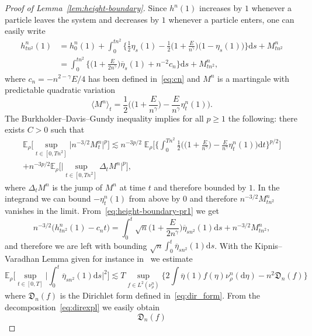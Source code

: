 \documentclass[10pt]{amsart}
\theoremstyle{definition}\newtheorem{defi}[theo]{Definition}\newtheorem{rema}[theo]{Remark}\newtheorem{exam}[theo]{Example}\newtheorem{exem}[theo]{Example}\newtheorem{nota}[theo]{Notation}
\renewcommand{\bar}{\overline}
\renewcommand{\ge}{\geqslant}
\newcommand*{\dd}{\mathrm{d}}
\newcommand*{\ds}{\dd s}
\newcommand*{\dt}{\dd t}
\begin{document}
\begin{proof}[Proof of Lemma~\ref{lem:height-boundary}]
Since $h^n(1)$ increases by $1$ whenever a particle leaves the system and decreases by $1$ whenever a particle enters, one can easily write
\begin{align}\label{eq:height-boundary-pr1}
\nonumber
h^n_{{tn^2}} (1) & = h_0^n(1) + \int_0^{{tn^2}} \bigg\{ \frac12 \eta_{{s}} (1) - \frac12 \Big(1 +
\frac{E}{n^{\gamma}} \Big) \big(1-\eta_{{s}}(1)\big) \bigg\} \ds + M^n_{{tn^2}}\\
& = \int_0^{{tn^2}} \bigg\{ \Big(1 +
\frac{E}{2n^{\gamma}} \Big) \bar\eta_{{s}} (1) + {n^{-2}} c_n \bigg\} \ds + M^n_{{tn^2}},
\end{align}
where $c_n=-n^{2-\gamma}E/4$ has been defined in~\eqref{eq:cn} and $M^n$ is a martingale with predictable quadratic variation
\[
\langle M^n \rangle_t = \frac{{1}}{2} \bigg(\Big(1 +
\frac{E}{n^{\gamma}} \Big) - \frac{E}{n^{\gamma}} \eta^n_{{t}} (1) \bigg).
\]
The Burkholder--Davis--Gundy inequality implies for all $p \ge 1$ the following: there exists $C>0$ such that
\begin{multline*}
\mathbb{E}_\rho \Big[\sup_{t \in [0,{{Tn^2}}]} \big| n^{- 3 / 2} M^n_t \big|^p\Big] \lesssim n^{- 3 p / 2} \; \mathbb{E}_\rho \bigg[\bigg\{ \int_0^{{Tn^2}} \frac{{1}}{2} \bigg(\Big(1 +
\frac{E}{n^{\gamma}} \Big) - \frac{E}{n^{\gamma}} \eta^n_{{t}} (1) \bigg) \dt \bigg\}^{p / 2} \bigg]\\
+ n^{- 3 p / 2} \mathbb{E}_\rho \Big[\Big| \sup_{t \in [0,{{Tn^2}}]} \Delta_t M^n \Big|^p\Big],
\end{multline*}
where $\Delta_t M^n$ is the jump of $M^n$ at time $t$ and therefore bounded by $1$. In the integrand we can bound $-\eta^n_{{t}} (1)$ from above by $0$ and therefore $n^{-3/2}M_{{tn^2}}^n$ vanishes in the limit. From~\eqref{eq:height-boundary-pr1} we get
\[
n^{-3/2}\big(h_{{tn^2}}^n(1)-c_nt\big) = \int_0^t \sqrt n \Big(1 +
\frac{E}{2n^{\gamma}} \Big) \bar\eta_{sn^2} (1) \ds + n^{-3/2} M_{{tn^2}}^n,
\]
and therefore we are left with bounding $\sqrt n \int_0^t \bar\eta_{sn^2} (1)\ds$. With the Kipnis--Varadhan Lemma given for instance in~\cite[Proposition~A.1.6.1]{kl} we estimate
\[
\mathbb{E}_{\rho} \Bigg[\sup_{t \in [0,T]} \bigg| \int_0^t
\bar\eta_{sn^2} (1) \ds \bigg|^2 \Bigg] \lesssim T \sup_{f\in L^2(\nu^n_\rho)} \bigg\{ 2
\int \bar\eta (1) f(\eta) \nu^n_\rho(\dd\eta) - n^2\mathfrak{D}_n(f) \bigg\}
\]
where $\mathfrak{D}_n(f)$ is the Dirichlet form defined in~\eqref{eq:dir_form}. From the decomposition~\eqref{eq:direxpl} we easily obtain
\[
\mathfrak{D}_n(f)
\]
\end{proof}
\end{document}
